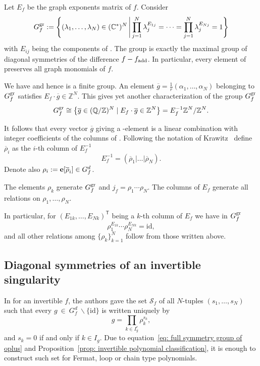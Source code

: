 \documentclass[pdftex]{sigma}
\numberwithin{equation}{section}
\newcommand{\CC}{{\mathbb{C}}}
\newcommand{\QQ}{{\mathbb{Q}}}
\newcommand{\ZZ}{{\mathbb{Z}}}
\newcommand{\calS}{{\mathcal S}}
\newcommand{\epi}{{\bf e}}
\newcommand{\id}{\mathrm{id}}
\begin{document}
Let $E_f$ be the graph exponents matrix of $f$. Consider
\begin{equation*}
G_f^{\rm gr} := \Biggl\{(\lambda_1,\dots,\lambda_N)\in (\CC^*)^N \, \Biggl|\, \prod_{j=1}^N \lambda_j ^{E_{1j}}=\dots =\prod_{j=1}^N\lambda_j^{E_{Nj}}=1 \Biggr\} \end{equation*}
with $E_{ij}$ being the components of .
The group  is exactly the maximal group of diagonal symmetries of the difference $f-f_{\rm add}$. In particular, every element of  preserves all graph monomials of $f$.

We have  and hence  is a finite group.
An element ${\overline g = \frac{1}{r}(\alpha_1,\dots,\alpha_N)}$ belonging to $G_f^{\rm gr}$ satisfies
$E_f \cdot \overline g \in \ZZ^N$.
This gives yet another characterization of the group $G_f^{\rm gr}$
\begin{equation*}%
	G_f^{\rm gr} \cong \bigl\lbrace \overline g \in (\QQ/\ZZ)^N \mid E_f \cdot \overline g \in \ZZ^N \bigr\rbrace = E_f^{-1} \ZZ^N / \ZZ^N.
\end{equation*}

It follows that every vector $\overline g$ giving a -element is a linear combination with integer coefficients of the columns of . Following the notation of Krawitz~\cite{K09} define $\overline \rho_i$ as the $i$-th column of $E_f^{-1}$
\begin{equation*}
	E_f^{-1} =  ( \overline \rho_1 | \dots | \overline \rho_N  ).
\end{equation*}
Denote also $\rho_i := \epi[\overline \rho_i] \in G_f^d$.

The elements $\rho_k$ generate $G_f^{\rm gr}$ and $j_f = \rho_1\cdots\rho_N$.
The columns of $E_f$ generate all relations on $\rho_1, \dots, \rho_N$.

In particular, for $(E_{1k}, \dots, E_{Nk})^{\mathsf{T}}$ being a $k$-th column of $E_f$ we have in $G_f^{\rm gr}$
\[
\rho_1^{E_{1k}}\cdots \rho_N^{E_{Nk}} = \id,
\]
and all other relations among $\lbrace \rho_k \rbrace_{k=1}^N$ follow from those written above.

\subsection{Diagonal symmetries of an invertible singularity}

In \cite{FJJS} for an invertible $f$, the authors gave the set $\calS_f$ of all $N$-tuples $(s_1,\dots,s_N)$ such that every $g~\in~G_f^d~\backslash\lbrace\id\rbrace$ is written uniquely by
\[
	g = \prod_{k \in I_g^c} \rho_k^{s_k},
\]
and $s_k = 0$ if and only if $k \in I_g$. Due to equation~\eqref{eq: full symmetry group of oplus} and Proposition~\ref{prop: invertible polynomial classification}, it is enough to construct such set for Fermat, loop or chain type polynomials.
\end{document}
